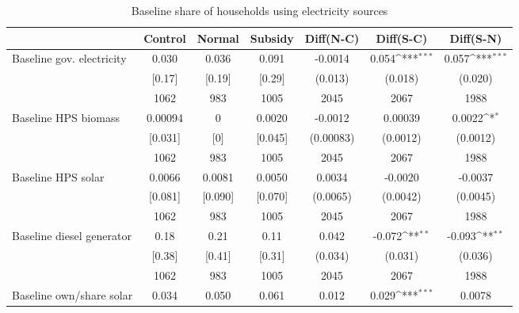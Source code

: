 \begin{table}[htbp]\centering
\def\sym#1{\ifmmode^{#1}\else\(^{#1}\)\fi}
\caption{Baseline share of households using electricity sources \label{tab:"balance"}}
\begin{tabular*}{1\hsize}{@{\hskip\tabcolsep\extracolsep\fill}l*{1}{cccccc}}
\toprule
                                &  Control&   Normal&  Subsidy&Diff(N-C)         &Diff(S-C)         &Diff(S-N)         \\
\midrule
Baseline gov. electricity       &    0.030&    0.036&    0.091&  -0.0014         &    0.054\sym{***}&    0.057\sym{***}\\
                                &   [0.17]&   [0.19]&   [0.29]&  (0.013)         &  (0.018)         &  (0.020)         \\
                                &     1062&      983&     1005&     2045         &     2067         &     1988         \\
Baseline HPS biomass            &  0.00094&        0&   0.0020&  -0.0012         &  0.00039         &   0.0022\sym{*}  \\
                                &  [0.031]&      [0]&  [0.045]&(0.00083)         & (0.0012)         & (0.0012)         \\
                                &     1062&      983&     1005&     2045         &     2067         &     1988         \\
Baseline HPS solar              &   0.0066&   0.0081&   0.0050&   0.0034         &  -0.0020         &  -0.0037         \\
                                &  [0.081]&  [0.090]&  [0.070]& (0.0065)         & (0.0042)         & (0.0045)         \\
                                &     1062&      983&     1005&     2045         &     2067         &     1988         \\
Baseline diesel generator       &     0.18&     0.21&     0.11&    0.042         &   -0.072\sym{**} &   -0.093\sym{**} \\
                                &   [0.38]&   [0.41]&   [0.31]&  (0.034)         &  (0.031)         &  (0.036)         \\
                                &     1062&      983&     1005&     2045         &     2067         &     1988         \\
Baseline own/share solar        &    0.034&    0.050&    0.061&    0.012         &    0.029\sym{***}&   0.0078         \\

\end{tabular*}
\end{table}
